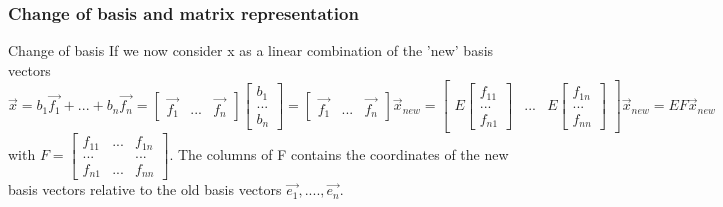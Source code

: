 \begin{frame}
	\frametitle{Change of basis and matrix representation}
	\begin{block}{Change of basis}
		If we now consider x as a linear combination of the 'new' basis vectors $\overrightarrow{x}=b_1\overrightarrow{f_1}+...+b_n\overrightarrow{f_n}=\begin{bmatrix} \overrightarrow{f_1} & ... & \overrightarrow{f_n} \end{bmatrix} \begin{bmatrix} b_1 \\ ...\\ b_n \end{bmatrix}=\begin{bmatrix} \overrightarrow{f_1} & ... & \overrightarrow{f_n} \end{bmatrix}\overrightarrow{x}_{new}= \begin{bmatrix} E\begin{bmatrix} f_{11} \\ ... \\ f_{n1} \end{bmatrix} & ... & E\begin{bmatrix} f_{1n} \\ ... \\ f_{nn} \end{bmatrix} \end{bmatrix}\overrightarrow{x}_{new}= EF\overrightarrow{x}_{new}$ with $F=\begin{bmatrix} 
		f_{11} & ... & f_{1n}\\
		... & & ...\\
		f_{n1} & ... & f_{nn} \end{bmatrix}$. The columns of F contains the coordinates of the new basis vectors relative to the old basis vectors $\overrightarrow{e_1},....,\overrightarrow{e_n}$. 
	\end{block}
\end{frame}

